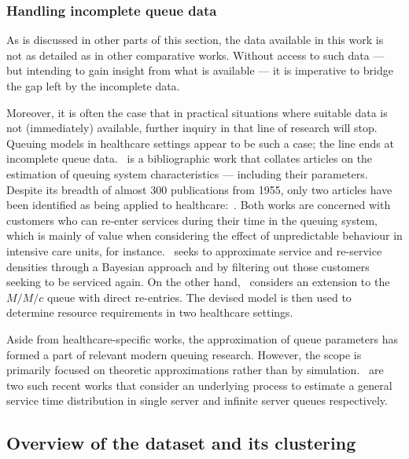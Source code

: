 \documentclass[11pt]{article}
\begin{document}
\subsubsection{Handling incomplete queue data}

As is discussed in other parts of this section, the data available in this work
is not as detailed as in other comparative works. Without access to such data
--- but intending to gain insight from what is available --- it is
imperative to bridge the gap left by the incomplete data.

Moreover, it is often the case that in practical situations where suitable data
is not (immediately) available, further inquiry in that line of research will
stop. Queuing models in healthcare settings appear to be such a case; the line
ends at incomplete queue data.~\cite{Asanjarani2017} is a bibliographic work
that collates articles on the estimation of queuing system characteristics ---
including their parameters. Despite its breadth of almost 300 publications from
1955, only two articles have been identified as being applied to
healthcare:~\cite{Mohammadi2012,Yom2014}. Both works are concerned with
customers who can re-enter services during their time in the queuing system,
which is mainly of value when considering the effect of unpredictable behaviour
in intensive care units, for instance.~\cite{Mohammadi2012} seeks to approximate
service and re-service densities through a Bayesian approach and by filtering
out those customers seeking to be serviced again. On the other
hand,~\cite{Yom2014} considers an extension to the \(M/M/c\) queue with direct
re-entries. The devised model is then used to determine resource requirements in
two healthcare settings.

Aside from healthcare-specific works, the approximation of queue parameters has
formed a part of relevant modern queuing research. However, the scope is
primarily focused on theoretic approximations rather than by
simulation.~\cite{Djabali2018,Goldenshluger2016} are two such recent works that
consider an underlying process to estimate a general service time distribution
in single server and infinite server queues respectively.

\subsection{Overview of the dataset and its clustering}\label{subsec:overview}
\end{document}
